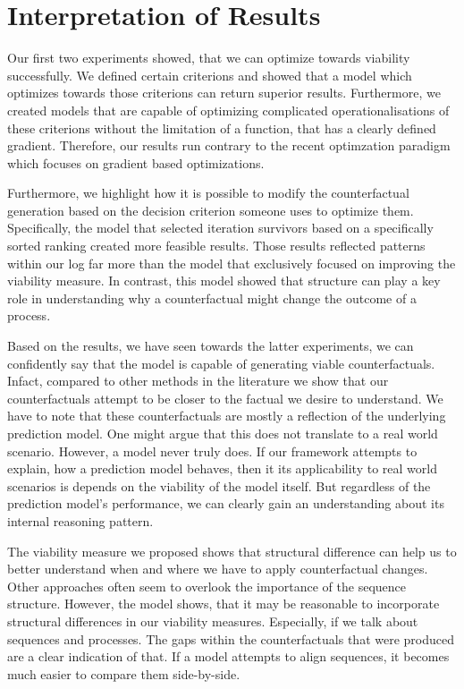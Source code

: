 \documentclass[12pt,a4paper]{report}
\begin{document}
\section{Interpretation of Results}
Our first two experiments showed, that we can optimize towards viability successfully. We defined certain criterions and showed that a model which optimizes towards those criterions can return superior results. Furthermore, we created models that are capable of optimizing complicated operationalisations of these criterions without the limitation of a function, that has a clearly defined gradient. Therefore, our results run contrary to the recent optimzation paradigm which focuses on gradient based optimizations. 

Furthermore, we highlight how it is possible to modify the counterfactual generation based on the decision criterion someone uses to optimize them. Specifically, the model that selected iteration survivors based on a specifically sorted ranking created more feasible results. Those results reflected patterns within our log far more than the model that exclusively focused on improving the viability measure. In contrast, this model showed that structure can play a key role in understanding why a counterfactual might change the outcome of a process. 

Based on the results, we have seen towards the latter experiments, we can confidently say that the model is capable of generating viable counterfactuals. Infact, compared to other methods in the literature we show that our counterfactuals attempt to be closer to the factual we desire to understand. We have to note that these counterfactuals are mostly a reflection of the underlying prediction model. One might argue that this does not translate to a real world scenario. However, a model never truly does. If our framework attempts to explain, how a prediction model behaves, then it its applicability to real world scenarios is depends on the viability of the model itself. But regardless of the prediction model's performance, we can clearly gain an understanding about its internal reasoning pattern.

The viability measure we proposed shows that structural difference can help us to better understand when and where we have to apply counterfactual changes. Other approaches often seem to overlook the importance of the sequence structure. However, the  model shows, that it may be reasonable to incorporate structural differences in our viability measures. Especially, if we talk about sequences and processes. The gaps within the counterfactuals that were produced are a clear indication of that. If a model attempts to align sequences, it becomes much easier to compare them side-by-side.  
\end{document}
